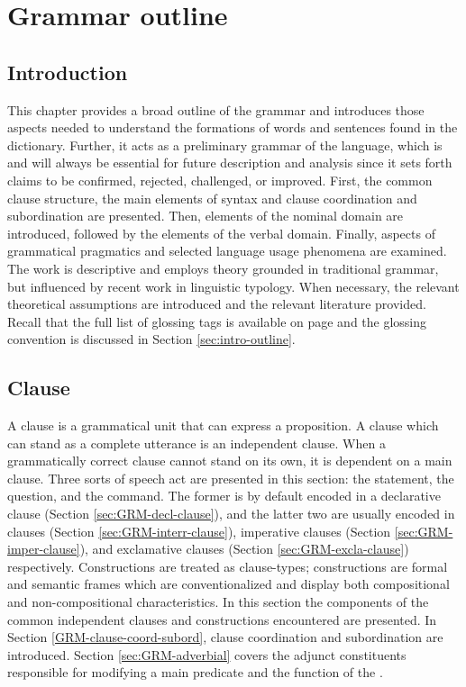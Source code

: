 \chapter{Grammar outline}
\label{sec:gramsketch}


\section{Introduction}
\label{sec:Introduction}

This chapter  provides a broad outline of the grammar and introduces those 
aspects needed to understand the formations of words and sentences found in the 
dictionary. Further, it acts as a preliminary grammar of the language, which is 
and will always be essential for future description and analysis since it sets 
forth claims to be confirmed, rejected, challenged,  or improved.   First, the 
common clause structure, the main elements of syntax and clause coordination and 
subordination are presented. Then, elements of the nominal domain  are 
introduced,  followed by the elements of the verbal domain. Finally, aspects of 
grammatical pragmatics and selected language usage phenomena are examined.  The work is 
descriptive and employs theory grounded in traditional grammar, but  influenced 
by  recent work in linguistic typology. When necessary, the relevant theoretical 
assumptions are introduced and the relevant literature provided. Recall that the 
full list of glossing tags is available on page \pageref{sec-ABB} and the 
glossing convention is discussed in Section \ref{sec:intro-outline}.

\section{Clause}
\label{sec:GRM-clause}

A clause is a  grammatical unit that can express a proposition. A clause which 
can stand as a complete utterance is an independent clause. When 
a grammatically correct clause cannot stand on its own, it is dependent on  a 
main clause.  Three sorts of speech act are presented in this section:  the statement,  the question, and 
the command. The former is by default encoded in a declarative clause (Section 
\ref{sec:GRM-decl-clause}), and the latter two are usually encoded in  
clauses (Section \ref{sec:GRM-interr-clause}), imperative clauses  (Section 
\ref{sec:GRM-imper-clause}), and exclamative clauses (Section 
\ref{sec:GRM-excla-clause}) respectively.  Constructions are treated as 
clause-types; constructions are  formal and semantic frames which are 
conventionalized and display both compositional and non-compositional 
characteristics. In this section  the components of the common 
independent  clauses and constructions encountered are presented.  In 
Section \ref{GRM-clause-coord-subord},  clause coordination and subordination 
are introduced. Section \ref{sec:GRM-adverbial} covers the adjunct constituents
responsible for modifying a main predicate and the function of the .



